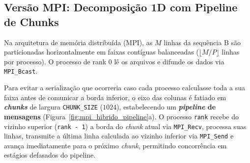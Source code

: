 \subsection{Versão MPI: Decomposição 1D com Pipeline de Chunks}
\label{sec:mpi}

Na arquitetura de memória distribuída (MPI), as $M$ linhas da sequência B são particionadas horizontalmente em faixas contíguas balanceadas ($\lfloor M/P \rfloor$ linhas por processo). O processo de rank $0$ lê os arquivos e difunde os dados via \texttt{MPI\_Bcast}. 

Para evitar a serialização que ocorreria caso cada processo calculasse toda a sua faixa antes de comunicar a borda inferior, o eixo das colunas é fatiado em \textbf{\textit{chunks}} de largura \texttt{CHUNK\_SIZE} ($1024$), estabelecendo um \textbf{\textit{pipeline} de mensagens} (Figura~\ref{fig:mpi_hibrido_pipeline}a). O processo \texttt{rank} recebe do vizinho superior (\texttt{rank - 1}) a borda do \textit{chunk} atual via \texttt{MPI\_Recv}, processa suas linhas, transmite a última linha calculada ao vizinho inferior via \texttt{MPI\_Send} e avança imediatamente para o próximo \textit{chunk}, permitindo concorrência em estágios defasados do pipeline.
